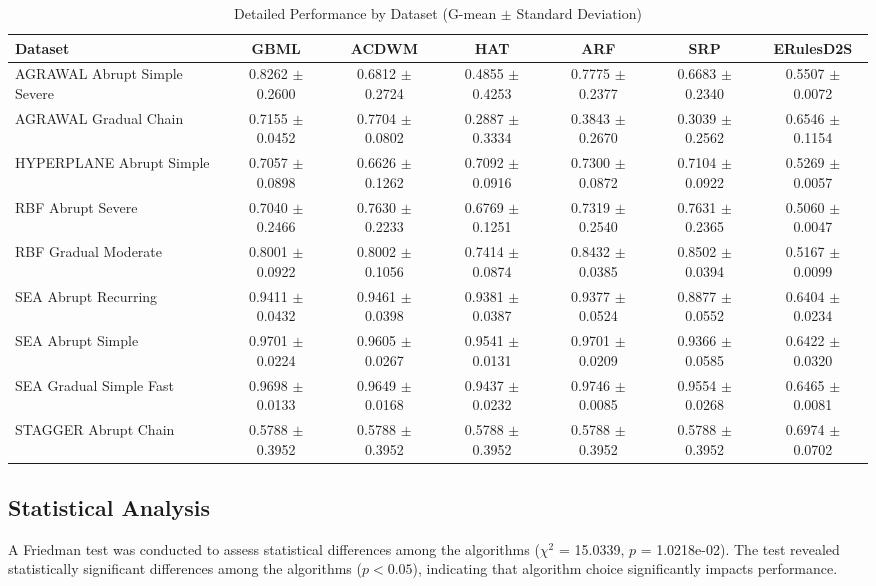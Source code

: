 \documentclass[conference]{IEEEtran}
\begin{document}
\begin{table}[htbp]
\caption{Detailed Performance by Dataset (G-mean $\pm$ Standard Deviation)}
\label{tab:bydata}
\centering
\small
\begin{tabular}{lcccccc}
\toprule
\textbf{Dataset} & \textbf{GBML} & \textbf{ACDWM} & \textbf{HAT} & \textbf{ARF} & \textbf{SRP} & \textbf{ERulesD2S} \\
\midrule
AGRAWAL Abrupt Simple Severe & 0.8262 $\pm$ 0.2600 & 0.6812 $\pm$ 0.2724 & 0.4855 $\pm$ 0.4253 & 0.7775 $\pm$ 0.2377 & 0.6683 $\pm$ 0.2340 & 0.5507 $\pm$ 0.0072 \\
AGRAWAL Gradual Chain & 0.7155 $\pm$ 0.0452 & 0.7704 $\pm$ 0.0802 & 0.2887 $\pm$ 0.3334 & 0.3843 $\pm$ 0.2670 & 0.3039 $\pm$ 0.2562 & 0.6546 $\pm$ 0.1154 \\
HYPERPLANE Abrupt Simple & 0.7057 $\pm$ 0.0898 & 0.6626 $\pm$ 0.1262 & 0.7092 $\pm$ 0.0916 & 0.7300 $\pm$ 0.0872 & 0.7104 $\pm$ 0.0922 & 0.5269 $\pm$ 0.0057 \\
RBF Abrupt Severe & 0.7040 $\pm$ 0.2466 & 0.7630 $\pm$ 0.2233 & 0.6769 $\pm$ 0.1251 & 0.7319 $\pm$ 0.2540 & 0.7631 $\pm$ 0.2365 & 0.5060 $\pm$ 0.0047 \\
RBF Gradual Moderate & 0.8001 $\pm$ 0.0922 & 0.8002 $\pm$ 0.1056 & 0.7414 $\pm$ 0.0874 & 0.8432 $\pm$ 0.0385 & 0.8502 $\pm$ 0.0394 & 0.5167 $\pm$ 0.0099 \\
SEA Abrupt Recurring & 0.9411 $\pm$ 0.0432 & 0.9461 $\pm$ 0.0398 & 0.9381 $\pm$ 0.0387 & 0.9377 $\pm$ 0.0524 & 0.8877 $\pm$ 0.0552 & 0.6404 $\pm$ 0.0234 \\
SEA Abrupt Simple & 0.9701 $\pm$ 0.0224 & 0.9605 $\pm$ 0.0267 & 0.9541 $\pm$ 0.0131 & 0.9701 $\pm$ 0.0209 & 0.9366 $\pm$ 0.0585 & 0.6422 $\pm$ 0.0320 \\
SEA Gradual Simple Fast & 0.9698 $\pm$ 0.0133 & 0.9649 $\pm$ 0.0168 & 0.9437 $\pm$ 0.0232 & 0.9746 $\pm$ 0.0085 & 0.9554 $\pm$ 0.0268 & 0.6465 $\pm$ 0.0081 \\
STAGGER Abrupt Chain & 0.5788 $\pm$ 0.3952 & 0.5788 $\pm$ 0.3952 & 0.5788 $\pm$ 0.3952 & 0.5788 $\pm$ 0.3952 & 0.5788 $\pm$ 0.3952 & 0.6974 $\pm$ 0.0702 \\
\bottomrule
\end{tabular}
\end{table}


\subsection{Statistical Analysis}

A Friedman test was conducted to assess statistical differences among the algorithms ($\chi^2$ = 15.0339, $p$ = 1.0218e-02). The test revealed statistically significant differences among the algorithms ($p < 0.05$), indicating that algorithm choice significantly impacts performance.
\end{document}
